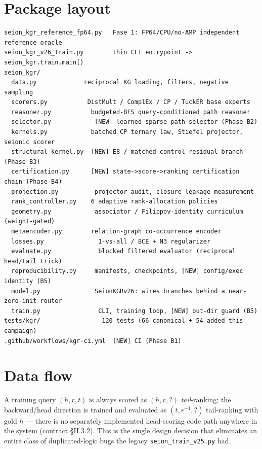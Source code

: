 \documentclass[11pt]{article}
\begin{document}

\tableofcontents

\section{Package layout}
\begin{verbatim}
seion_kgr_reference_fp64.py   Fase 1: FP64/CPU/no-AMP independent reference oracle
seion_kgr_v26_train.py        thin CLI entrypoint -> seion_kgr.train.main()
seion_kgr/
  data.py             reciprocal KG loading, filters, negative sampling
  scorers.py           DistMult / ComplEx / CP / TuckER base experts
  reasoner.py           budgeted-BFS query-conditioned path reasoner
  selector.py            [NEW] learned sparse path selector (Phase B2)
  kernels.py            batched CP ternary law, Stiefel projector, seionic scorer
  structural_kernel.py  [NEW] E8 / matched-control residual branch (Phase B3)
  certification.py      [NEW] state->score->ranking certification chain (Phase B4)
  projection.py          projector audit, closure-leakage measurement
  rank_controller.py    6 adaptive rank-allocation policies
  geometry.py            associator / Filippov-identity curriculum (weight-gated)
  metaencoder.py        relation-graph co-occurrence encoder
  losses.py               1-vs-all / BCE + N3 regularizer
  evaluate.py             blocked filtered evaluator (reciprocal head/tail trick)
  reproducibility.py     manifests, checkpoints, [NEW] config/exec identity (B5)
  model.py               SeionKGRv26: wires branches behind a near-zero-init router
  train.py                CLI, training loop, [NEW] out-dir guard (B5)
tests/kgr/                 120 tests (66 canonical + 54 added this campaign)
.github/workflows/kgr-ci.yml  [NEW] CI (Phase B1)
\end{verbatim}

\section{Data flow}
A training query $(h,r,t)$ is always scored as $(h,r,?)$ \emph{tail}-ranking; the backward/head
direction is trained and evaluated as $(t, r^{-1}, ?)$ tail-ranking with gold $h$ --- there is no
separately implemented head-scoring code path anywhere in the system (contract \S II.3.2). This is
the single design decision that eliminates an entire class of duplicated-logic bugs the legacy
\texttt{seion\_train\_v25.py} had.
\end{document}
